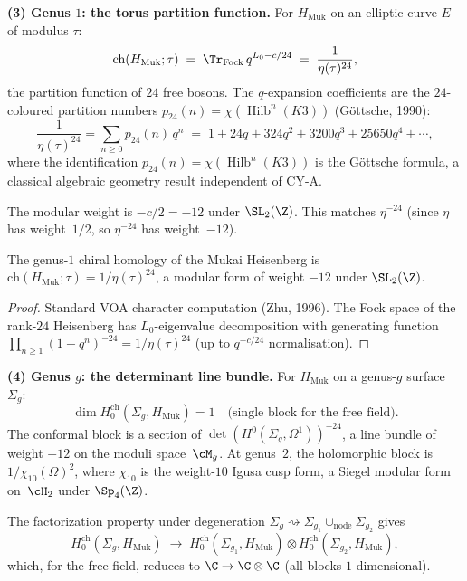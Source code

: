 \noindent\textbf{(3) Genus $1$: the torus partition function.}
For $H_{\mathrm{Muk}}$ on an elliptic curve $E$ of modulus $\tau$:
\begin{equation}\label{eq:ch-hom-torus}
 \mathrm{ch}(H_{\mathrm{Muk}}; \tau)
 \;=\;
 \Tr_{\mathrm{Fock}} \, q^{L_0 - c/24}
 \;=\;
 \frac{1}{\eta(\tau)^{24}},
\end{equation}
the partition function of $24$ free bosons. The $q$-expansion coefficients are the $24$-coloured partition numbers $p_{24}(n) = \chi(\operatorname{Hilb}^n(K3))$ (G\"ottsche, 1990):
\[
 \frac{1}{\eta(\tau)^{24}} = \sum_{n \geq 0} p_{24}(n)\, q^n
 \;=\;
 1 + 24q + 324q^2 + 3200q^3 + 25650q^4 + \cdots,
\]
where the identification $p_{24}(n) = \chi(\operatorname{Hilb}^n(K3))$ is the G\"ottsche formula, a classical algebraic geometry result independent of CY-A.

The modular weight is $-c/2 = -12$ under $\SL_2(\Z)$. This matches $\eta^{-24}$ (since $\eta$ has weight~$1/2$, so $\eta^{-24}$ has weight~$-12$).

\begin{proposition}
\label{prop:torus-block-hmuk}
The genus-$1$ chiral homology of the Mukai Heisenberg is $\mathrm{ch}(H_{\mathrm{Muk}}; \tau) = 1/\eta(\tau)^{24}$, a modular form of weight $-12$ under $\SL_2(\Z)$.
\end{proposition}

\begin{proof}
Standard VOA character computation (Zhu, 1996).
The Fock space of the rank-$24$ Heisenberg has $L_0$-eigenvalue decomposition with generating function $\prod_{n \geq 1} (1 - q^n)^{-24} = 1/\eta(\tau)^{24}$ (up to $q^{-c/24}$ normalisation).
\end{proof}

\noindent\textbf{(4) Genus $g$: the determinant line bundle.}
For $H_{\mathrm{Muk}}$ on a genus-$g$ surface $\Sigma_g$:
\begin{equation}\label{eq:ch-hom-genus-g}
 \dim H_0^{\mathrm{ch}}(\Sigma_g, H_{\mathrm{Muk}}) = 1 \quad\text{(single block for the free field)}.
\end{equation}
The conformal block is a section of $\det(H^0(\Sigma_g, \Omega^1))^{-24}$, a line bundle of weight $-12$ on the moduli space~$\cM_g$. At genus~$2$, the holomorphic block is $1/\chi_{10}(\Omega)^2$, where $\chi_{10}$ is the weight-$10$ Igusa cusp form, a Siegel modular form on~$\cH_2$ under $\Sp_4(\Z)$.

The factorization property under degeneration $\Sigma_g \rightsquigarrow \Sigma_{g_1} \cup_{\mathrm{node}} \Sigma_{g_2}$ gives
\[
 H_0^{\mathrm{ch}}(\Sigma_g, H_{\mathrm{Muk}})
 \;\to\;
 H_0^{\mathrm{ch}}(\Sigma_{g_1}, H_{\mathrm{Muk}})
 \otimes
 H_0^{\mathrm{ch}}(\Sigma_{g_2}, H_{\mathrm{Muk}}),
\]
which, for the free field, reduces to $\C \to \C \otimes \C$ (all blocks $1$-dimensional).

